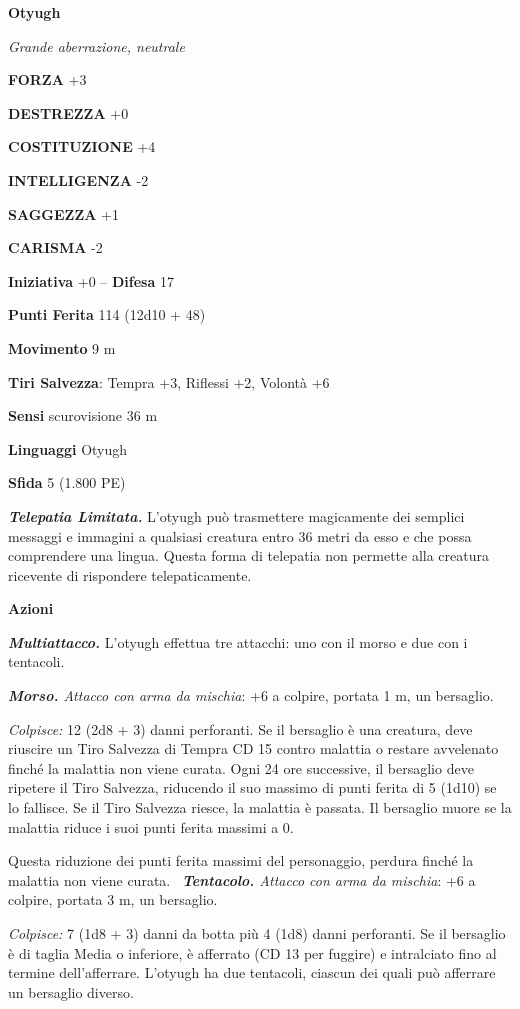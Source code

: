\begin{multicols}{2}
\medskip{}\textbf{Otyugh}

\emph{Grande aberrazione, neutrale}

\textbf{FORZA} +3

\textbf{DESTREZZA} +0

\textbf{COSTITUZIONE} +4

\textbf{INTELLIGENZA} -2

\textbf{SAGGEZZA} +1

\textbf{CARISMA} -2

\textbf{Iniziativa} +0 -- \textbf{Difesa} 17

\textbf{Punti Ferita} 114 (12d10 + 48)

\textbf{Movimento} 9 m

\textbf{Tiri Salvezza}: Tempra +3, Riflessi +2, Volontà +6

\textbf{Sensi} scurovisione 36 m

\textbf{Linguaggi} Otyugh

\textbf{Sfida} 5 (1.800 PE)

\emph{\textbf{Telepatia Limitata.}} L'otyugh può trasmettere magicamente dei semplici messaggi e immagini a qualsiasi creatura entro 36 metri da esso e che possa comprendere una lingua. Questa forma di telepatia non permette alla creatura ricevente di rispondere telepaticamente.

\textbf{Azioni}

\emph{\textbf{Multiattacco.}} L'otyugh effettua tre attacchi: uno con il morso e due con i tentacoli.

\emph{\textbf{Morso.} Attacco con arma da mischia}: +6 a colpire, portata 1 m, un bersaglio.

\emph{Colpisce:} 12 (2d8 + 3) danni perforanti. Se il bersaglio è una creatura, deve riuscire un Tiro Salvezza di Tempra CD 15 contro malattia o restare avvelenato finché la malattia non viene curata. Ogni 24 ore successive, il bersaglio deve ripetere il Tiro Salvezza, riducendo il suo massimo di punti ferita di 5 (1d10) se lo fallisce. Se il Tiro Salvezza riesce, la malattia è passata. Il bersaglio muore se la malattia riduce i suoi punti ferita massimi a 0.

Questa riduzione dei punti ferita massimi del personaggio, perdura finché la malattia non viene curata.
\
\emph{\textbf{Tentacolo.} Attacco con arma da mischia}: +6 a colpire, portata 3 m, un bersaglio.

\emph{Colpisce:} 7 (1d8 + 3) danni da botta più 4 (1d8) danni perforanti. Se il bersaglio è di taglia Media o inferiore, è afferrato (CD 13 per fuggire) e intralciato fino al termine dell'afferrare. L'otyugh ha due tentacoli, ciascun dei quali può afferrare un bersaglio diverso.


\end{multicols}
